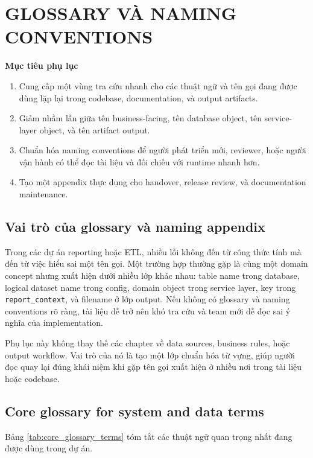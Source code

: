 \chapter{GLOSSARY VÀ NAMING CONVENTIONS}

\noindent\textbf{Mục tiêu phụ lục}

\begin{enumerate}[label=-]
\item Cung cấp một vùng tra cứu nhanh cho các thuật ngữ và tên gọi đang được dùng lặp lại trong codebase, documentation, và output artifacts.
\item Giảm nhầm lẫn giữa tên business-facing, tên database object, tên service-layer object, và tên artifact output.
\item Chuẩn hóa naming conventions để người phát triển mới, reviewer, hoặc người vận hành có thể đọc tài liệu và đối chiếu với runtime nhanh hơn.
\item Tạo một appendix thực dụng cho handover, release review, và documentation maintenance.
\end{enumerate}

\section{Vai trò của glossary và naming appendix}

Trong các dự án reporting hoặc ETL, nhiều lỗi không đến từ công thức tính mà đến từ việc hiểu sai một tên gọi. Một trường hợp thường gặp là cùng một domain concept nhưng xuất hiện dưới nhiều lớp khác nhau: table name trong database, logical dataset name trong config, domain object trong service layer, key trong \texttt{report\_context}, và filename ở lớp output. Nếu không có glossary và naming conventions rõ ràng, tài liệu dễ trở nên khó tra cứu và team mới dễ đọc sai ý nghĩa của implementation.

Phụ lục này không thay thế các chapter về data sources, business rules, hoặc output workflow. Vai trò của nó là tạo một lớp chuẩn hóa từ vựng, giúp người đọc quay lại đúng khái niệm khi gặp tên gọi xuất hiện ở nhiều nơi trong tài liệu hoặc codebase.

\section{Core glossary for system and data terms}

Bảng \ref{tab:core_glossary_terms} tóm tắt các thuật ngữ quan trọng nhất đang được dùng trong dự án.

